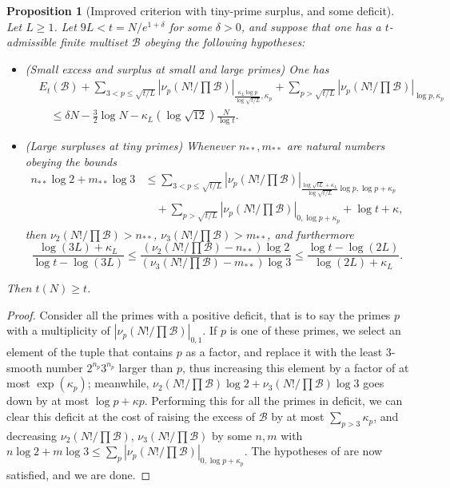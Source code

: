 \documentclass[12pt,a4paper,reqno]{amsart}
\numberwithin{equation}{section}
\theoremstyle{plain}
\newtheorem{proposition}[theorem]{Proposition}
\theoremstyle{definition}
\newcommand\tuple{{\mathcal B}}
\begin{document}
\begin{proposition}[Improved criterion with tiny-prime surplus, and some deficit]\label{balance-23''}  Let $L \geq 1$.  Let $9L < t = N/e^{1+\delta}$ for some $\delta>0$, and suppose that one has a $t$-admissible finite multiset $\tuple$ obeying the following hypotheses:
  \begin{itemize}
  \item[(i)] (Small excess and surplus at small and large primes) One has
\begin{equation}\label{new-balance-5}
    \begin{split}
&      E_t(\tuple) + \sum_{3 < p \leq \sqrt{t/L}}
   |\nu_p(N!/\prod \tuple)|_{\frac{\kappa_L \log p}{\log \sqrt{t/L}},\kappa_p} + 
   \sum_{p>\sqrt{t/L}} |\nu_p(N!/\prod \tuple)|_{\log p,\kappa_p}\\
&\quad    \leq \delta N - \frac{3}{2} \log N - \kappa_L (\log \sqrt{12}) \frac{N}{\log t}.
    \end{split}
  \end{equation}
  \item[(ii)] (Large surpluses at tiny primes) 
  Whenever $n_{**}, m_{**}$ are natural numbers obeying the bounds
  \begin{align*}
   n_{**} \log 2 + m_{**} \log 3 &\leq 
    \sum_{3 < p \leq \sqrt{t/L}}
    |\nu_p(N!/\prod \tuple)|_{\frac{\log \sqrt{tL} + \kappa_L}{\log\sqrt{t/L}} \log p,\log p+\kappa_p}\\
  &\quad   + 
    \sum_{p > \sqrt{t/L}} |\nu_p(N!/\prod \tuple)|_{0,\log p + \kappa_p}   
    + \log t + \kappa,
  \end{align*}
    then $\nu_2(N!/\prod \tuple) > n_{**}$, $\nu_3(N!/\prod \tuple) > m_{**}$, and furthermore
  $$
  \frac{\log(3L)+\kappa_L}{\log t - \log(3L)} \leq \frac{(\nu_2(N!/\prod \tuple)-n_{**}) \log 2}{(\nu_3(N!/\prod \tuple)-m_{**}) \log 3} \leq \frac{\log t - \log(2L)}{\log(2L)+\kappa_L}.
  $$
  \end{itemize}
     Then $t(N) \geq t$.
\end{proposition}

\begin{proof} Consider all the primes with a positive deficit, that is to say the primes $p$ with a multiplicity of $|\nu_p(N!/\prod \tuple)|_{0,1}$.  If $p$ is one of these primes, we select an element of the tuple that contains $p$ as a factor, and replace it with the least $3$-smooth number $2^{n_p} 3^{n_p}$ larger than $p$, thus increasing this element by a factor of at most $\exp(\kappa_p)$; meanwhile, $\nu_2(N!/\prod \tuple) \log 2 + \nu_3(N!/\prod \tuple) \log 3$ goes down by at most $\log p + \kappa p$.  Performing this for all the primes in deficit, we can clear this deficit at the cost of raising the excess of $\tuple$ by at most $\sum_{p>3} \kappa_p$, and decreasing $\nu_2(N!/\prod \tuple)$, $\nu_3(N!/\prod \tuple)$ by some $n,m$ with $n \log 2 + m \log 3 \leq \sum_p |\nu_p(N!/\prod \tuple)|_{0,\log p+\kappa_p}$.  The hypotheses of  are now satisfied, and we are done.
\end{proof}
\end{document}
